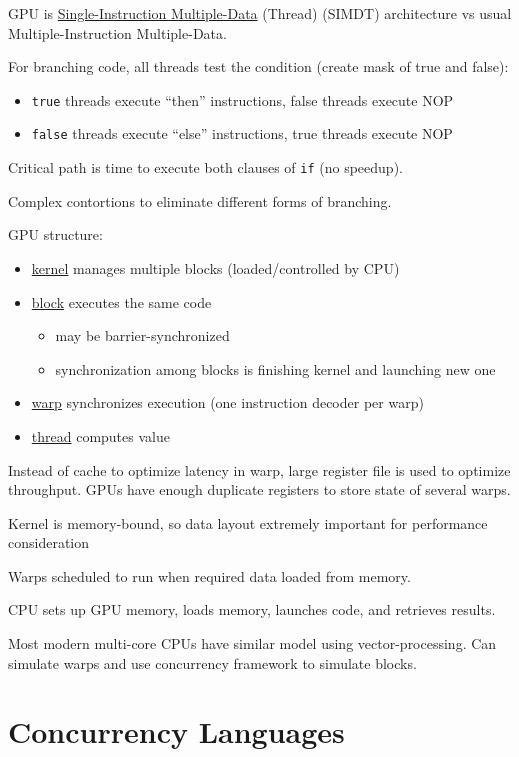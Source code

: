\documentclass[11pt]{article}
\begin{document}
GPU is \uline{Single-Instruction Multiple-Data} (Thread) (SIMDT) architecture vs usual
Multiple-Instruction Multiple-Data.

For branching code, all threads test the condition (create mask of true and false):
\begin{itemize}
\item \texttt{true} threads execute ``then'' instructions, false threads execute NOP
\item \texttt{false} threads execute ``else'' instructions, true threads execute NOP
\end{itemize}

Critical path is time to execute both clauses of \texttt{if} (no speedup).

Complex contortions to eliminate different forms of branching.

GPU structure:
\begin{itemize}
\item \uline{kernel} manages multiple blocks (loaded/controlled by CPU)
\item \uline{block} executes the same code
\begin{itemize}
\item may be barrier-synchronized
\item synchronization among blocks is finishing kernel and launching new one
\end{itemize}
\item \uline{warp} synchronizes execution (one instruction decoder per warp)
\item \uline{thread} computes value
\end{itemize}

Instead of cache to optimize latency in warp, large register file is used to
optimize throughput.
GPUs have enough duplicate registers to store state of several warps.

Kernel is memory-bound, so data layout extremely important for performance
consideration

Warps scheduled to run when required data loaded from memory.

CPU sets up GPU memory, loads memory, launches code, and retrieves results.

Most modern multi-core CPUs have similar model using vector-processing.
Can simulate warps and use concurrency framework to simulate blocks.
\section{Concurrency Languages}
\label{sec:org202abae}
\end{document}
